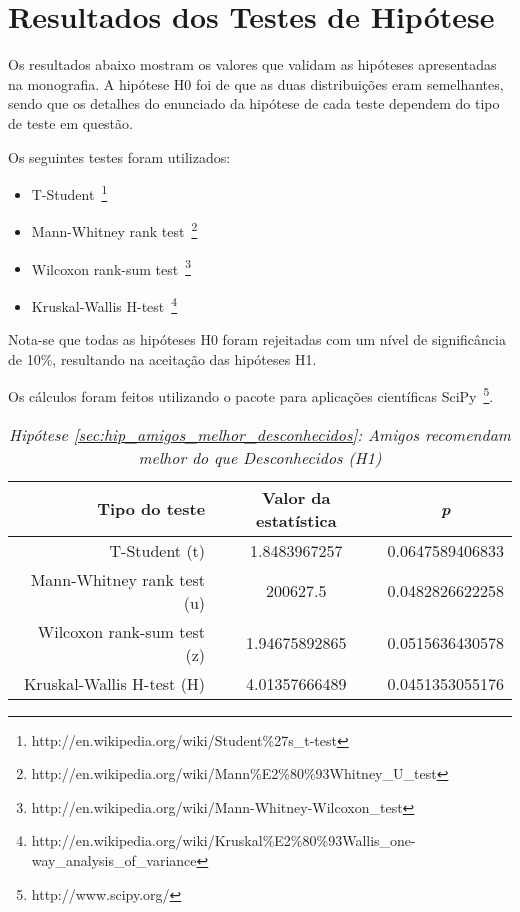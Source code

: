 \appendix
\chapter{Resultados dos Testes de Hipótese}
\label{anexo_hipoteses}

Os resultados abaixo mostram os valores que validam as hipóteses apresentadas na monografia. A hipótese H0 foi de que as duas distribuições eram semelhantes, sendo que os detalhes do enunciado da hipótese de cada teste dependem do tipo de teste em questão.

Os seguintes testes foram utilizados:

\begin{itemize}
    \item T-Student~\footnote{http://en.wikipedia.org/wiki/Student\%27s\_t-test}
    \item Mann-Whitney rank test~\footnote{http://en.wikipedia.org/wiki/Mann\%E2\%80\%93Whitney\_U\_test}
    \item Wilcoxon rank-sum test~\footnote{http://en.wikipedia.org/wiki/Mann-Whitney-Wilcoxon\_test}
    \item Kruskal-Wallis H-test~\footnote{http://en.wikipedia.org/wiki/Kruskal\%E2\%80\%93Wallis\_one-way\_analysis\_of\_variance}

\end{itemize}

Nota-se que todas as hipóteses H0 foram rejeitadas com um nível de significância de 10\%, resultando na aceitação das hipóteses H1.

Os cálculos foram feitos utilizando o pacote para aplicações científicas SciPy~\footnote{http://www.scipy.org/}.

\begin{table}
\centering
\begin{tabular}{|r|c|c|}
    \hline
    \textbf{Tipo do teste} & \textbf{Valor da estatística} & \textbf{\textit{p}} \\
    \hline
T-Student (t) & 1.8483967257 & 0.0647589406833 \\
\hline 
Mann-Whitney rank test (u) & 200627.5 & 0.0482826622258 \\
\hline 
Wilcoxon rank-sum test (z) & 1.94675892865 & 0.0515636430578 \\
\hline 
Kruskal-Wallis H-test (H) & 4.01357666489 & 0.0451353055176 \\
\hline 

\end{tabular}
\caption{\it Hipótese \ref{sec:hip_amigos_melhor_desconhecidos}: Amigos recomendam melhor do que Desconhecidos (H1)}
\end{table}


